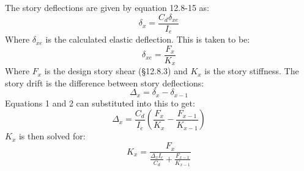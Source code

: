 \documentclass{article}
\begin{document}
The story deflections are given by equation 12.8-15 as:
$$\delta_x = \frac{C_d \delta_{xe}}{I_e}$$
Where $\delta_{xe}$ is the calculated elastic deflection. This is taken to be:
$$\delta_{xe} = \frac{F_x}{K_x}$$
Where $F_x$ is the design story shear (\S 12.8.3) and $K_x$ is the story stiffness.
The story drift is the difference between story deflections:
$$\Delta_x = \delta_x - \delta_{x-1}$$
Equations 1 and 2 can substituted into this to get:
$$\Delta_x = \frac{C_d}{I_e} \left(\frac{F_x}{K_x} - \frac{F_{x-1}}{K_{x-1}}\right)$$
$K_x$ is then solved for:
$$K_x = \frac{F_x}{\frac{\Delta_x I_e}{C_d} + \frac{F_{x-1}}{K_{x-1}}}$$
\end{document}
